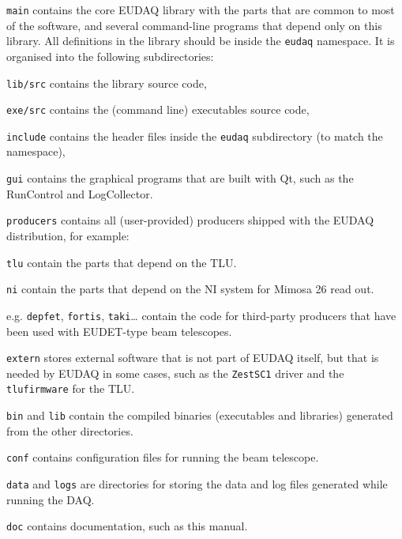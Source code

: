 \begin{myitemize}
\item \texttt{main}
  contains the core EUDAQ library with the parts that are common to most of the software,
  and several command-line programs that depend only on this library.
  All definitions in the library should be inside the \texttt{eudaq} namespace.
  It is organised into the following subdirectories:
  \begin{myitemize}
  \item \texttt{lib/src}
    contains the library source code,
  \item \texttt{exe/src}
    contains the (command line) executables source code,
  \item \texttt{include}
    contains the header files inside the \texttt{eudaq} subdirectory (to match the namespace),
  \end{myitemize}
\item \texttt{gui}
  contains the graphical programs that are built with Qt, such as the RunControl and LogCollector.
\item \texttt{producers}
  contains all (user-provided) producers shipped with the EUDAQ
  distribution, for example:
  \begin{myitemize}
\item \texttt{tlu}
  contain the parts that depend on the \gls{TLU}.
\item \texttt{ni}
  contain the parts that depend on the \gls{NI} system for Mimosa 26 read out.
\item e.g. \texttt{depfet}, \texttt{fortis}, \texttt{taki}\ldots{}
  contain the code for third-party producers that have been used with
  EUDET-type beam telescopes.
  \end{myitemize}
\item \texttt{extern}
  stores external software that is not part of EUDAQ itself, but that is needed by EUDAQ in some cases,
  such as the \texttt{ZestSC1} driver and the \texttt{tlufirmware} for the \gls{TLU}.
\item \texttt{bin} and \texttt{lib}
  contain the compiled binaries (executables and libraries) generated from the other directories.
\item \texttt{conf}
  contains configuration files for running the beam telescope.
\item \texttt{data} and \texttt{logs}
  are directories for storing the data and log files generated while running the DAQ.
\item \texttt{doc}
  contains documentation, such as this manual.
\end{myitemize}

